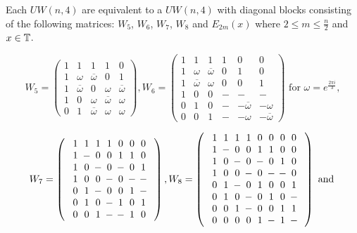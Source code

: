 \begin{lemma}\label{lem:w4-upper}
 
Each $UW(n,4)$ are equivalent to a $UW(n,4)$ with diagonal blocks consisting of the following matrices: $W_5$, $W_6$, $W_7$, $W_8$ and $E_{2m}(x)$ where $2 \leq m \leq \frac{n}{2}$ and $x \in \mathbb{T}$.

$$
W_5=\left(
\begin{array}{rrrrr}
 1 & 1 &1 &1 &0 \\
 1 & \omega &\overline{\omega} &0 &1\\
 1 & \overline{\omega} &0 &\omega &\overline{\omega} \\
 1 & 0 &\omega &\overline{\omega} & \omega \\
 0 & 1 & \overline{\omega} &\omega &\omega 
\end{array}
\right),
W_6=\left(
\begin{array}{rrrrrr}
 1 & 1 &1 &1 &0 &0\\
 1 & \omega &\overline{\omega} &0 &1 &0\\
 1 & \overline{\omega} &\omega &0 &0 &1\\
 1 & 0 & 0 & - & - & - \\
 0 & 1 & 0 & - & -\overline{\omega} &-\omega \\
 0 & 0 & 1 & - & -\omega &-\overline{\omega}
\end{array}
\right)
\text{ for } \omega = e^{\frac{2\pi i}{3}},
$$

 $$W_7=\left(\begin{array}{c}
\Zp\Zp\Zp\Zp\Zz\Zz\Zz\\
\Zp\Zm\Zz\Zz\Zp\Zp\Zz\\
\Zp\Zz\Zm\Zz\Zm\Zz\Zp\\
\Zp\Zz\Zz\Zm\Zz\Zm\Zm\\
\Zz\Zp\Zm\Zz\Zz\Zp\Zm\\
\Zz\Zp\Zz\Zm\Zp\Zz\Zp\\
\Zz\Zz\Zp\Zm\Zm\Zp\Zz
\end{array}\right), 
W_8=\left(\begin{array}{c}
\Zp\Zp\Zp\Zp\Zz\Zz\Zz\Zz\\
\Zp\Zm\Zz\Zz\Zp\Zp\Zz\Zz\\
\Zp\Zz\Zm\Zz\Zm\Zz\Zp\Zz\\
\Zp\Zz\Zz\Zm\Zz\Zm\Zm\Zz\\
\Zz\Zp\Zm\Zz\Zp\Zz\Zz\Zp\\
\Zz\Zp\Zz\Zm\Zz\Zp\Zz\Zm\\
\Zz\Zz\Zp\Zm\Zz\Zz\Zp\Zp\\
\Zz\Zz\Zz\Zz\Zp\Zm\Zp\Zm
\end{array}\right) \text{ and }$$



\end{lemma}
